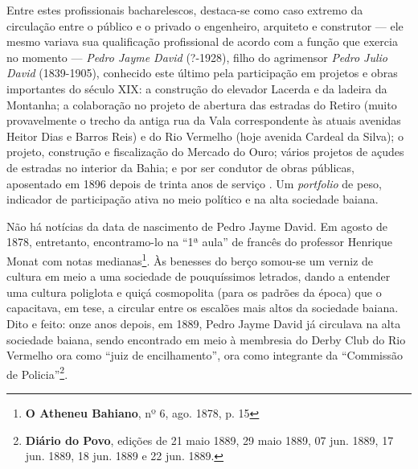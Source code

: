 Entre estes profissionais bacharelescos, destaca-se como caso extremo da circulação entre o público e o privado o engenheiro, arquiteto e construtor --- ele mesmo variava sua qualificação profissional de acordo com a função que exercia no momento --- \textit{Pedro Jayme David} (?-1928), filho do agrimensor \textit{Pedro Julio David} (1839-1905), conhecido este último pela participação em projetos e obras importantes do século XIX: a construção do elevador Lacerda e da ladeira da Montanha; a colaboração no projeto de abertura das estradas do Retiro (muito provavelmente o trecho da antiga rua da Vala correspondente às atuais avenidas Heitor Dias e Barros Reis) e do Rio Vermelho (hoje avenida Cardeal da Silva); o projeto, construção e fiscalização do Mercado do Ouro; vários projetos de açudes de estradas no interior da Bahia; e por ser condutor de obras públicas, aposentado em 1896 depois de trinta anos de serviço \cite[pp.~327-328]{querino_artistas_2018}. Um \textit{portfolio} de peso, indicador de participação ativa no meio político e na alta sociedade baiana.

Não há notícias da data de nascimento de Pedro Jayme David. Em agosto de 1878, entretanto, encontramo-lo na ``1ª aula'' de francês do professor Henrique Monat com notas medianas\footnote{\textbf{O Atheneu Bahiano}, nº 6, ago. 1878, p. 15}. Às benesses do berço somou-se um verniz de cultura em meio a uma sociedade de pouquíssimos letrados, dando a entender uma cultura poliglota e quiçá cosmopolita (para os padrões da época) que o capacitava, em tese, a circular entre os escalões mais altos da sociedade baiana. Dito e feito: onze anos depois, em 1889, Pedro Jayme David já circulava na alta sociedade baiana, sendo encontrado em meio à membresia do Derby Club do Rio Vermelho ora como ``juiz de encilhamento'', ora como integrante da ``Commissão de Policia''\footnote{\textbf{Diário do Povo}, edições de 21 maio 1889, 29 maio 1889, 07 jun. 1889, 17 jun. 1889, 18 jun. 1889 e 22 jun. 1889.}. 

